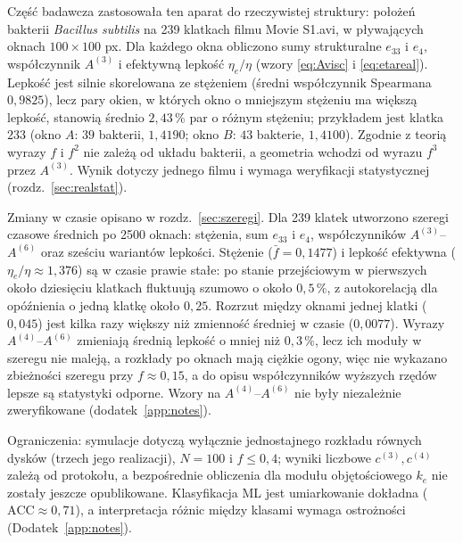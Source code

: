 \documentclass[12pt,a4paper,twoside,openright]{report}
\theoremstyle{definition}
\theoremstyle{remark}
\newcommand{\ziel}[1]{{\color{green!50!black}#1}}
\begin{document}
Część badawcza zastosowała ten aparat do rzeczywistej struktury: położeń bakterii \emph{Bacillus subtilis} na 239 klatkach filmu Movie S1.avi, w pływających oknach $100\times100$ px. Dla każdego okna obliczono sumy strukturalne $e_{33}$ i $e_4$, współczynnik $A^{(3)}$ i efektywną lepkość $\eta_e/\eta$ (wzory \eqref{eq:Avisc} i \eqref{eq:etareal}). Lepkość jest silnie skorelowana ze stężeniem (średni współczynnik Spearmana $0{,}9825$), lecz pary okien, w których okno o mniejszym stężeniu ma większą lepkość, stanowią średnio $2{,}43\,\%$ par o różnym stężeniu; przykładem jest klatka $233$ (okno $A$: $39$ bakterii, $1{,}4190$; okno $B$: $43$ bakterie, $1{,}4100$). Zgodnie z teorią wyrazy $f$ i $f^2$ nie zależą od układu bakterii, a geometria wchodzi od wyrazu $f^3$ przez $A^{(3)}$. Wynik dotyczy jednego filmu i wymaga weryfikacji statystycznej (rozdz.~\ref{sec:realstat}).

\ziel{Zmiany w czasie opisano w rozdz.~\ref{sec:szeregi}. Dla 239 klatek utworzono szeregi czasowe średnich po 2500 oknach: stężenia, sum $e_{33}$ i $e_4$, współczynników $A^{(3)}$--$A^{(6)}$ oraz sześciu wariantów lepkości. Stężenie ($\bar f=0{,}1477$) i lepkość efektywna ($\eta_e/\eta\approx1{,}376$) są w czasie prawie stałe: po stanie przejściowym w pierwszych około dziesięciu klatkach fluktuują szumowo o około $0{,}5\,\%$, z autokorelacją dla opóźnienia o jedną klatkę około $0{,}25$. Rozrzut między oknami jednej klatki ($0{,}045$) jest kilka razy większy niż zmienność średniej w czasie ($0{,}0077$). Wyrazy $A^{(4)}$--$A^{(6)}$ zmieniają średnią lepkość o mniej niż $0{,}3\,\%$, lecz ich moduły w szeregu nie maleją, a rozkłady po oknach mają ciężkie ogony, więc nie wykazano zbieżności szeregu przy $f\approx0{,}15$, a do opisu współczynników wyższych rzędów lepsze są statystyki odporne. Wzory na $A^{(4)}$--$A^{(6)}$ nie były niezależnie zweryfikowane (dodatek~\ref{app:notes}).}

Ograniczenia: symulacje dotyczą wyłącznie jednostajnego rozkładu równych dysków (trzech jego realizacji), $N=100$ i $f\le0{,}4$; wyniki liczbowe $c^{(3)},c^{(4)}$ zależą od protokołu, a bezpośrednie obliczenia dla modułu objętościowego $k_e$ nie zostały jeszcze opublikowane. Klasyfikacja ML jest umiarkowanie dokładna ($\mathrm{ACC}\approx0{,}71$), a interpretacja różnic między klasami wymaga ostrożności (Dodatek~\ref{app:notes}).
\end{document}
